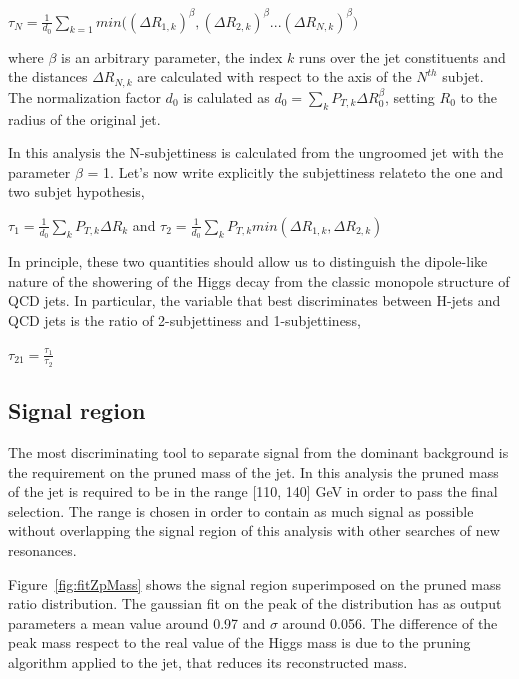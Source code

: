 \documentclass[12pt]{article} %
\begin{document}
$\tau_{N} = \frac{1}{d_{0}}\sum_{k=1}^{}{min((\Delta R_{1,k})^\beta, (\Delta R_{2,k})^\beta ... (\Delta R_{N,k})^\beta})$

where $\beta$ is an arbitrary parameter, the index $k$ runs over the jet constituents and the distances $\Delta R_{N,k}$ are calculated with respect to the axis of the $N^{th}$ subjet. The normalization factor $d_{0}$ is calulated as $d_{0} = \sum_{k}{P_{T,k}\Delta R^{\beta}_{0}}$, setting $R_{0}$ to the radius of the original jet.

In this analysis the N-subjettiness is calculated from the ungroomed jet with the parameter $\beta$ = 1. Let’s now write explicitly the subjettiness relateto the one and two subjet hypothesis,

$\tau_{1} = \frac{1}{d_{0}}\sum_{k}{P_{T,k}\Delta R_{k}}$  and  $\tau_{2} = \frac{1}{d_{0}}\sum_{k}{P_{T,k}min(\Delta R_{1,k},\Delta R_{2,k})}$

In principle, these two quantities should allow us to distinguish the dipole-like nature of the showering of the Higgs decay from the classic monopole structure of QCD jets. In particular, the variable that best discriminates between H-jets and QCD jets is the ratio of 2-subjettiness and 1-subjettiness,

$\tau_{21} = \frac{\tau_{1}}{\tau_{2}}$



\subsection{Signal region} %
 
The most discriminating tool to separate signal from the dominant background is the requirement on the pruned mass of the jet. In this analysis the pruned mass of the jet is required to be in the range [110, 140] GeV in order to pass the final selection. The range is chosen in order to contain as much signal as possible without overlapping the signal region of this analysis with other searches of new resonances.

Figure~\ref{fig:fitZpMass} shows the signal region superimposed on the pruned mass ratio distribution. The gaussian fit on the peak of the distribution has as output parameters a mean value around 0.97 and $\sigma$ around 0.056. The difference of the peak mass respect to the real value of the Higgs mass is due to the pruning algorithm applied to the jet, that reduces its reconstructed mass.
\end{document}
